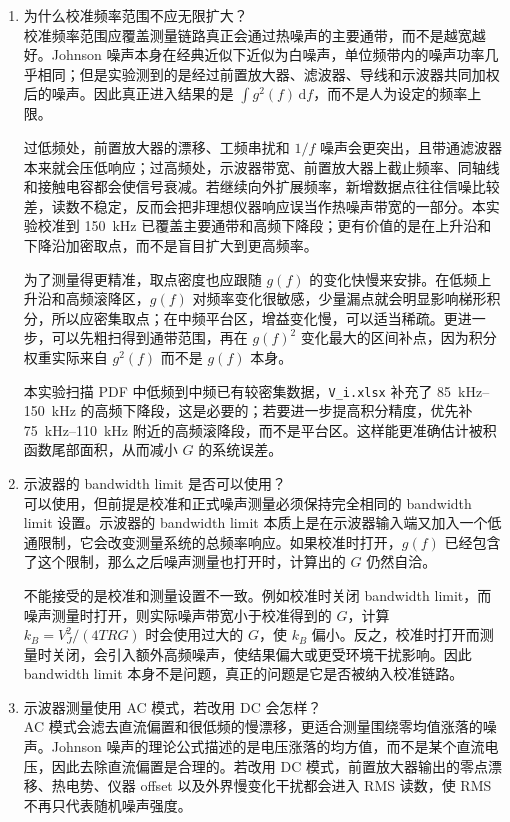 \documentclass[11pt]{article}
\begin{document}
\begin{enumerate}
    \item 为什么校准频率范围不应无限扩大？\\
    校准频率范围应覆盖测量链路真正会通过热噪声的主要通带，而不是越宽越好。Johnson 噪声本身在经典近似下近似为白噪声，单位频带内的噪声功率几乎相同；但是实验测到的是经过前置放大器、滤波器、导线和示波器共同加权后的噪声。因此真正进入结果的是 $\int g^2(f)\,\mathrm df$，而不是人为设定的频率上限。

    过低频处，前置放大器的漂移、工频串扰和 $1/f$ 噪声会更突出，且带通滤波器本来就会压低响应；过高频处，示波器带宽、前置放大器上截止频率、同轴线和接触电容都会使信号衰减。若继续向外扩展频率，新增数据点往往信噪比较差，读数不稳定，反而会把非理想仪器响应误当作热噪声带宽的一部分。本实验校准到 \SI{150}{kHz} 已覆盖主要通带和高频下降段；更有价值的是在上升沿和下降沿加密取点，而不是盲目扩大到更高频率。

    为了测量得更精准，取点密度也应跟随 $g(f)$ 的变化快慢来安排。在低频上升沿和高频滚降区，$g(f)$ 对频率变化很敏感，少量漏点就会明显影响梯形积分，所以应密集取点；在中频平台区，增益变化慢，可以适当稀疏。更进一步，可以先粗扫得到通带范围，再在 $g(f)^2$ 变化最大的区间补点，因为积分权重实际来自 $g^2(f)$ 而不是 $g(f)$ 本身。

    本实验扫描 PDF 中低频到中频已有较密集数据，\texttt{V\_i.xlsx} 补充了 \SIrange{85}{150}{kHz} 的高频下降段，这是必要的；若要进一步提高积分精度，优先补 \SIrange{75}{110}{kHz} 附近的高频滚降段，而不是平台区。这样能更准确估计被积函数尾部面积，从而减小 $G$ 的系统误差。

    \item 示波器的 bandwidth limit 是否可以使用？\\
    可以使用，但前提是校准和正式噪声测量必须保持完全相同的 bandwidth limit 设置。示波器的 bandwidth limit 本质上是在示波器输入端又加入一个低通限制，它会改变测量系统的总频率响应。如果校准时打开，$g(f)$ 已经包含了这个限制，那么之后噪声测量也打开时，计算出的 $G$ 仍然自洽。

    不能接受的是校准和测量设置不一致。例如校准时关闭 bandwidth limit，而噪声测量时打开，则实际噪声带宽小于校准得到的 $G$，计算 $k_B=V_J^2/(4TRG)$ 时会使用过大的 $G$，使 $k_B$ 偏小。反之，校准时打开而测量时关闭，会引入额外高频噪声，使结果偏大或更受环境干扰影响。因此 bandwidth limit 本身不是问题，真正的问题是它是否被纳入校准链路。

    \item 示波器测量使用 AC 模式，若改用 DC 会怎样？\\
    AC 模式会滤去直流偏置和很低频的慢漂移，更适合测量围绕零均值涨落的噪声。Johnson 噪声的理论公式描述的是电压涨落的均方值，而不是某个直流电压，因此去除直流偏置是合理的。若改用 DC 模式，前置放大器输出的零点漂移、热电势、仪器 offset 以及外界慢变化干扰都会进入 RMS 读数，使 RMS 不再只代表随机噪声强度。


\end{enumerate}
\end{document}
